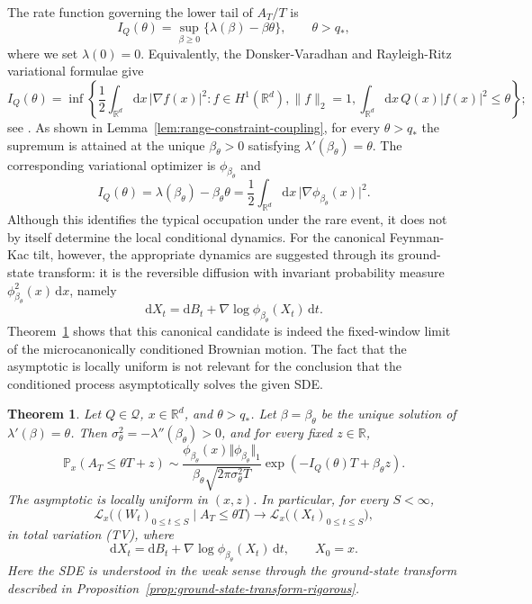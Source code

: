 \documentclass[11pt,reqno]{amsart}
\newtheorem{theorem}{Theorem}[section]
\theoremstyle{definition}
\numberwithin{equation}{section}
\newcommand{\<}{\langle}
\renewcommand{\>}{\rangle}
\def\R{{\mathbb R}}
\def\de{{\rm d}}
\def\prob{{\mathbb P}}
\def\cL{{\cal L}}
\def\de{{\mathrm {d}}}
\def\cQ{{\mathcal{Q}}}
\def\cL{{\mathcal{L}}}
\begin{document}
The rate function governing the lower tail of  $A_T/T $ is
\[
  I_Q(\theta)
  =
  \sup_{\beta\geq 0}
  \bigl\{
    \lambda(\beta)-\beta\theta
  \bigr\},
  \qquad \theta>q_*,
\]
where we set  $\lambda(0)=0 $. Equivalently, the
Donsker-Varadhan and Rayleigh-Ritz variational formulae give
\[
  I_Q(\theta)
  =
  \inf
  \left\{
    \frac{1}{2}
    \int_{\mathbb{R}^d} \de x \,
      \lvert\nabla f(x)\rvert^2
    :
      f\in H^1(\mathbb{R}^d), \lVert f\rVert_2=1,
      \int_{\mathbb{R}^d} \de x \, Q(x)|f(x)|^2\leq\theta
  \right\};
\]
see \cite{DV75a,DV75c}.
As shown in Lemma~\ref{lem:range-constraint-coupling}, for every  $\theta>q_* $ the supremum is
attained at the unique  $\beta_\theta>0 $ satisfying
$\lambda'(\beta_\theta)=\theta$.
The corresponding variational optimizer is
 $\phi_{\beta_\theta} $ 
and
\[
  I_Q(\theta)
  =
  \lambda(\beta_\theta)-\beta_\theta\theta
  =
  \frac{1}{2}
    \int_{\mathbb{R}^d} \de x \,
    \lvert\nabla\phi_{\beta_\theta}(x)\rvert^2.
\]
Although this identifies the typical occupation under the
rare event, it does not by itself determine the local conditional
dynamics. For the canonical Feynman-Kac tilt, however, the appropriate
dynamics are suggested through its ground-state transform: it is the reversible
diffusion with invariant probability measure  $\phi_{\beta_\theta}^2(x) \, \de x $, namely
\[
  \de X_t
  =
  \de B_t
  +\nabla\log\phi_{\beta_\theta}(X_t)\,\de t.
\]
Theorem~\ref{thm:main} shows that this canonical candidate is indeed the
fixed-window limit of the microcanonically conditioned Brownian
motion. The fact that the asymptotic is locally uniform is not relevant for the conclusion that the conditioned process asymptotically solves the given SDE. 
\begin{theorem}
\label{thm:main}
Let $Q\in\cQ$, $x\in\mathbb R^d$, and $\theta>q_*$.  Let
$\beta=\beta_\theta$ be the unique solution of
$\lambda'(\beta)=\theta$.  Then $\sigma_\theta^2 = - \lambda''(\beta_\theta)>0$, and for every fixed
$z\in\R$,
\begin{equation}
\label{equ:precise_asymptotics}
 \prob_x(A_T\leq \theta T+z)
 \sim
 \frac{\phi_{\beta_\theta}(x)\Vert\phi_{\beta_\theta}\Vert_1}
      {\beta_\theta\sqrt{2\pi\sigma_\theta^2T}}
 \exp(-I_Q(\theta)T+\beta_\theta z).
\end{equation}
The asymptotic is locally uniform in $(x,z)$.
In particular, for every $S<\infty$,
\begin{equation}
    \nonumber
 \cL_x\bigl((W_t)_{0\leq t\leq S}\mid A_T\leq\theta T\bigr)
 \longrightarrow
 \cL_x\bigl((X_t)_{0\leq t\leq S}\bigr),
\end{equation}
in total variation (TV), where
\[
 \de X_t=\de B_t+\nabla\log\phi_{\beta_\theta}(X_t)\,\de t,
 \qquad X_0=x.
\]
Here the SDE is understood in the weak sense through the
ground-state transform described in
Proposition~\ref{prop:ground-state-transform-rigorous}.
\end{theorem}
\end{document}
